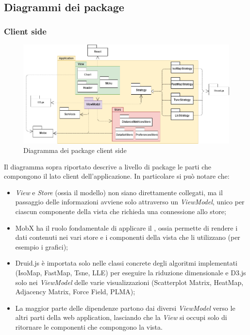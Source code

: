 \subsection{Diagrammi dei package}
\subsubsection{Client side}
\begin{figure}[hb]
\includegraphics[width=18cm]{Images/Allegato Tecnico-Package}
\centering
\caption{Diagramma dei package client side}
\end{figure}

Il diagramma sopra riportato descrive a livello di package le parti che compongono il lato client dell'applicazione. In particolare si può notare che:
\begin{itemize}
	\item \textit{View} e \textit{Store} (ossia il modello) non siano direttamente collegati, ma il passaggio delle informazioni avviene solo attraverso un \textit{ViewModel}, unico per ciascun componente della vista che richieda una connessione allo store; 
		\item MobX ha il ruolo fondamentale di applicare il , ossia permette di rendere i dati contenuti nei vari store  e i componenti della vista che li utilizzano  (per esempio i grafici);
	\item Druid.js è importata solo nelle classi concrete degli algoritmi implementati (IsoMap, FastMap, Tsne, LLE) per eseguire la riduzione dimensionale e D3.js solo nei \textit{ViewModel} delle varie visualizzazioni (Scatterplot Matrix, HeatMap, Adjacency Matrix, Force Field, PLMA);
	\item La maggior parte delle dipendenze partono dai diversi \textit{ViewModel} verso le altri parti della web application, lasciando che la \textit{View} si occupi solo di ritornare le componenti che compongono la vista.
\end{itemize} 

